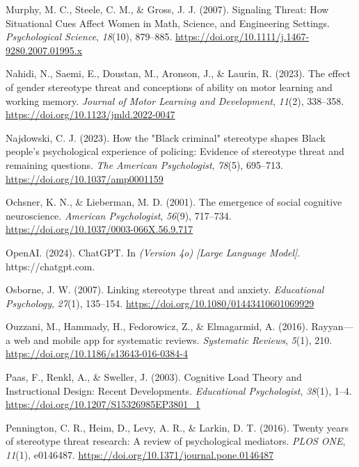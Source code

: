 \documentclass[
  stu, a4paper,floatsintext]{apa7}
\newlength{\cslhangindent}
\newenvironment{CSLReferences}[2] %
 {\begin{list}{}{%
  \setlength{\itemindent}{0pt}
  \setlength{\leftmargin}{0pt}
  \setlength{\parsep}{0pt}
  \ifodd #1
   \setlength{\leftmargin}{\cslhangindent}
   \setlength{\itemindent}{-1\cslhangindent}
  \fi
  \setlength{\itemsep}{#2\baselineskip}}}
 {\end{list}}
\begin{document}
\begin{CSLReferences}{1}{0}
Murphy, M. C., Steele, C. M., \& Gross, J. J. (2007). Signaling {Threat}: {How Situational Cues Affect Women} in {Math}, {Science}, and {Engineering Settings}. \emph{Psychological Science}, \emph{18}(10), 879--885. \url{https://doi.org/10.1111/j.1467-9280.2007.01995.x}

Nahidi, N., Saemi, E., Doustan, M., Aronson, J., \& Laurin, R. (2023). The effect of gender stereotype threat and conceptions of ability on motor learning and working memory. \emph{Journal of Motor Learning and Development}, \emph{11}(2), 338--358. \url{https://doi.org/10.1123/jmld.2022-0047}

Najdowski, C. J. (2023). How the "{Black} criminal" stereotype shapes {Black} people's psychological experience of policing: {Evidence} of stereotype threat and remaining questions. \emph{The American Psychologist}, \emph{78}(5), 695--713. \url{https://doi.org/10.1037/amp0001159}

Ochsner, K. N., \& Lieberman, M. D. (2001). The emergence of social cognitive neuroscience. \emph{American Psychologist}, \emph{56}(9), 717--734. \url{https://doi.org/10.1037/0003-066X.56.9.717}

OpenAI. (2024). {ChatGPT}. In \emph{(Version 4o) {[}Large Language Model{]}}. https://chatgpt.com.

Osborne, J. W. (2007). Linking stereotype threat and anxiety. \emph{Educational Psychology}, \emph{27}(1), 135--154. \url{https://doi.org/10.1080/01443410601069929}

Ouzzani, M., Hammady, H., Fedorowicz, Z., \& Elmagarmid, A. (2016). Rayyan---a web and mobile app for systematic reviews. \emph{Systematic Reviews}, \emph{5}(1), 210. \url{https://doi.org/10.1186/s13643-016-0384-4}

Paas, F., Renkl, A., \& Sweller, J. (2003). Cognitive {Load Theory} and {Instructional Design}: {Recent Developments}. \emph{Educational Psychologist}, \emph{38}(1), 1--4. \url{https://doi.org/10.1207/S15326985EP3801_1}

Pennington, C. R., Heim, D., Levy, A. R., \& Larkin, D. T. (2016). Twenty years of stereotype threat research: A review of psychological mediators. \emph{PLOS ONE}, \emph{11}(1), e0146487. \url{https://doi.org/10.1371/journal.pone.0146487}


\end{CSLReferences}
\end{document}

